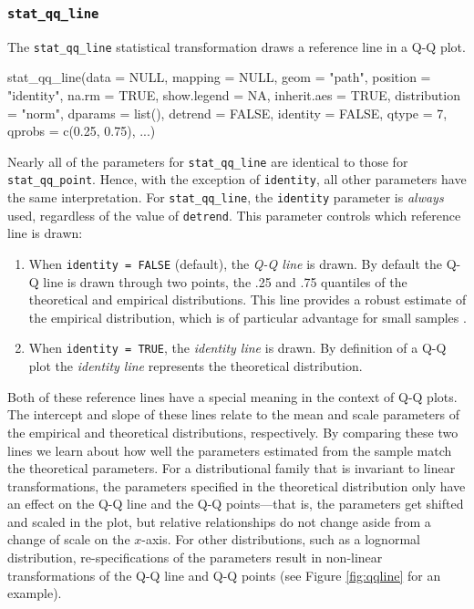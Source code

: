 \subsubsection{\texorpdfstring{\texttt{stat\_qq\_line}}{stat\_qq\_line}}\label{stat_qq_line}

The \texttt{stat\_qq\_line} statistical transformation draws a reference
line in a Q-Q plot.

\begin{Schunk}
\begin{Sinput}
stat_qq_line(data = NULL,
             mapping = NULL,
             geom = "path",
             position = "identity",
             na.rm = TRUE,
             show.legend = NA,
             inherit.aes = TRUE,
             distribution = "norm",
             dparams = list(),
             detrend = FALSE,
             identity = FALSE,
             qtype = 7,
             qprobs = c(0.25, 0.75),
             ...)
\end{Sinput}
\end{Schunk}

Nearly all of the parameters for \texttt{stat\_qq\_line} are identical
to those for \texttt{stat\_qq\_point}. Hence, with the exception of
\texttt{identity}, all other parameters have the same interpretation.
For \texttt{stat\_qq\_line}, the \texttt{identity} parameter is
\emph{always} used, regardless of the value of \texttt{detrend}. This
parameter controls which reference line is drawn:

\begin{enumerate}
\def\labelenumi{\alph{enumi})}
\tightlist
\item
  When \texttt{identity\ =\ FALSE} (default), the \emph{Q-Q line} is
  drawn. By default the Q-Q line is drawn through two points, the .25
  and .75 quantiles of the theoretical and empirical distributions. This
  line provides a robust estimate of the empirical distribution, which
  is of particular advantage for small samples \citep{Loy2016-fg}.
\item
  When \texttt{identity\ =\ TRUE}, the \emph{identity line} is drawn. By
  definition of a Q-Q plot the \emph{identity line} represents the
  theoretical distribution.
\end{enumerate}

Both of these reference lines have a special meaning in the context of
Q-Q plots. The intercept and slope of these lines relate to the mean and
scale parameters of the empirical and theoretical distributions,
respectively. By comparing these two lines we learn about how well the
parameters estimated from the sample match the theoretical parameters.
For a distributional family that is invariant to linear transformations,
the parameters specified in the theoretical distribution only have an
effect on the Q-Q line and the Q-Q points---that is, the parameters get
shifted and scaled in the plot, but relative relationships do not change
aside from a change of scale on the \(x\)-axis. For other distributions,
such as a lognormal distribution, re-specifications of the parameters
result in non-linear transformations of the Q-Q line and Q-Q points (see
Figure \ref{fig:qqline} for an example).

